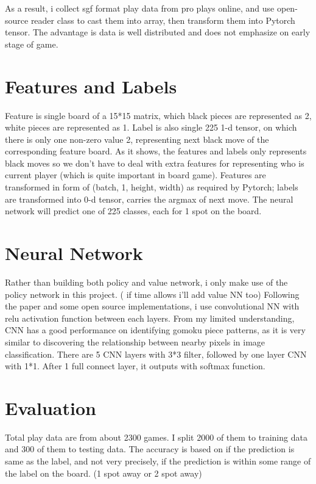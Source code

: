 \documentclass[11pt, twocolumn]{article}
\begin{document}
As a result, i collect sgf format play data from pro plays online, and use open-source reader class to cast them into array, then transform them into Pytorch tensor. The advantage is data is well distributed and does not emphasize on early stage of game.

\section{Features and Labels}
Feature is single board of a 15*15 matrix, which black pieces are represented as 2, white pieces are represented as 1. 
Label is also single 225 1-d tensor, on which there is only one non-zero value 2, representing next black move of the corresponding feature board. As it shows, the features and labels only represents black moves so we don't have to deal with extra features for representing who is current player (which is quite important in board game). \newline
Features are transformed in form of (batch, 1, height, width) as required by Pytorch; labels are transformed into 0-d tensor, carries the argmax of next move. The neural network will predict one of 225 classes, each for 1 spot on the board.

\section{Neural Network}
 Rather than building both policy and value network, i only make use of the policy network in this project. ( if time allows i'll add value NN too) Following the paper and some open source implementations, i use convolutional NN with relu activation function between each layers. From my limited understanding, CNN has a good performance on identifying gomoku piece patterns, as it is very similar to discovering the relationship between nearby pixels in image classification. \newline
 There are 5 CNN layers with 3*3 filter, followed by one layer CNN with 1*1. After 1 full connect layer, it outputs with softmax function. 



\section{Evaluation}
Total play data are from about 2300 games. I split 2000 of them to training data and 300 of them to testing data. \newline
The accuracy is based on if the prediction is same as the label, and not very precisely, if the prediction is within some range of the label on the board. (1 spot away or 2 spot away)
\end{document}
